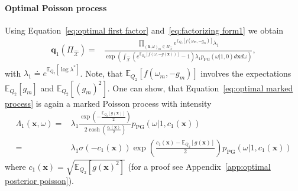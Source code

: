\documentclass[twoside,11pt]{article}
\newcommand{\EE}[2]{\mathbb{E}_{#1}\left[ #2 \right]}
\newcommand{\set}[1]{\left\lbrace #1 \right\rbrace}
\newcommand{\bs}[1]{\boldsymbol{#1}}
\newcommand{\bx}{\boldsymbol{x}}
\newcommand{\PG}{p_{\scriptscriptstyle \mathrm{PG}}}
\newcommand{\calS}{\mathcal{S}}
\newcommand{\X}{\mathcal{X}}
\begin{document}
\paragraph{Optimal Poisson process}
Using Equation~\eqref{eq:optimal first factor}  and~\eqref{eq:factorizing form1} we obtain
\begin{equation}\label{eq:optimal marked process}
\begin{split}
\bs{q}_1(\Pi_{\hat{\X}})  = & \frac{\prod_{(\bx,\omega)_m\in\Pi_{\hat{\X}}} e^{\EE{Q_2}{f(\omega_m,-g_m)}}\lambda_{\scriptstyle 1}}{\exp\left(\int_{\hat{\X}} \left(e^{\EE{Q_2}{f(\omega,-g(\bx))}}-1\right)
\lambda_{1}\PG(\omega\vert 1,0) d\bx d\omega\right)},
\end{split}
\end{equation}
with $\lambda_{1} \doteq e^{\EE{Q_2}{\log \lambda^*}}$. Note, that $\EE{Q_2}{f(\omega_m,-g_m)}$ involves the expectations $\EE{Q_2}{g_m}$ and $\EE{Q_2}{(g_m)^2}$. One can show, that Equation~\eqref{eq:optimal marked process} is again a marked Poisson process with intensity
\begin{equation}\label{eq:posterior mean measure}
\begin{split}
\Lambda_{1}(\bx,\omega) = & \lambda_{1}\frac{\exp\left(-\frac{\EE{Q_2}{g(\bx)}}{2} \right)}{2\cosh\left(\frac{c_{1}(\bx)}{2}\right)} 
\PG\left(\omega \vert 1, c_{1}(\bx)\right) \\
= & \lambda_1 \sigma(-c_1(\bx))\exp\left(\frac{c_1(\bx) - \EE{Q_2}{g(\bx)}}{2}\right)\PG\left(\omega \vert 1, c_{1}(\bx)\right)
\end{split}
\end{equation}
where $c_{1}(\bx) = \sqrt{\EE{Q_2}{g(\bx)^2}}$ (for a proof see Appendix~\ref{app:optimal posterior poisson}).
\end{document}
